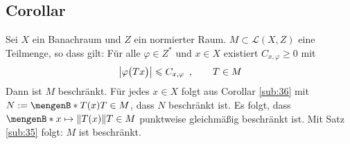 \subsection[Corollar über Beschränktheit einer Teilmenge von $\mathcal{L}(X,Z)$]{Corollar} %
\label{sub:37}
Sei $X$ ein Banachraum und $Z$ ein normierter Raum. $M \subset \mathcal{L}(X,Z)$ eine Teilmenge, so dass gilt: Für alle $\varphi \in Z^*$ und $x \in X$ existiert $C_{x,\varphi} \ge 0$
mit
\[
	\abs*{\varphi \enbrace[\big]{Tx}} \le C_{x,\varphi} \enspace, \qquad T \in M
\]
Dann ist $M$ beschränkt.
Für jedes $x \in X$ folgt aus Corollar \ref{sub:36} mit $N := \set[T(x)]{T \in M}$, dass $N$ beschränkt ist. Es folgt, dass $ \set[x \mapsto \norm{T(x)} ]{T \in M}$ 
punktweise gleichmäßig beschränkt ist. Mit Satz \ref{sub:35} folgt: $M$ ist beschränkt. \bewende

